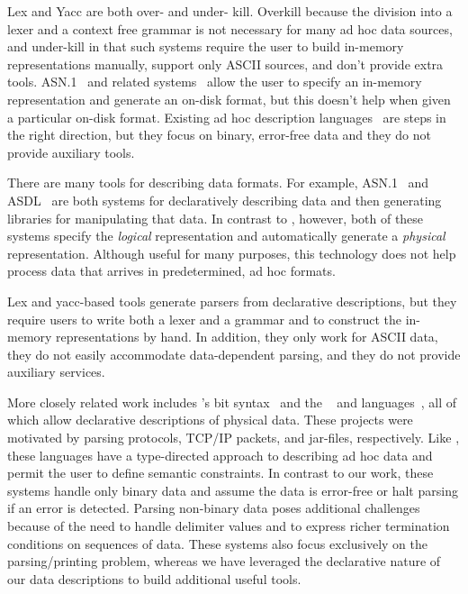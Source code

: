 \documentclass[11pt]{article}
\begin{document}
Lex and Yacc are
both over- and under- kill.  Overkill because the division into a
lexer and a context free grammar is not necessary for many ad hoc data
sources, and under-kill in that such systems require the user to build
in-memory representations manually, support only ASCII sources, and
don't provide extra tools.  ASN.1~\cite{asn} and related
systems~\cite{asdl} allow the user to specify an in-memory
representation and generate an on-disk format, but this doesn't help
when given a particular on-disk format.  Existing ad hoc description
languages~\cite{gpce02,sigcomm00,erlang} are steps in the right
direction, but they focus on binary, error-free data and they do not
provide auxiliary tools.


There are many tools for describing data formats. For example,
\textsc{ASN.1}~\cite{asn} and \textsc{ASDL}~\cite{asdl} are both
systems for declaratively describing data and then generating
libraries for manipulating that data.  In contrast to \pads{},
however, both of these systems specify the {\em logical\/} representation
and automatically generate a {\em physical\/} representation.
Although useful for many purposes, this technology does not help
process data that arrives in predetermined, ad hoc formats.

Lex and yacc-based tools generate parsers from declarative
descriptions, but they require users to write both a lexer and a
grammar and to construct the in-memory representations by hand.  In
addition, they only work for ASCII data, they do not easily
accommodate data-dependent parsing, and they do not provide auxiliary
services.

More closely related work includes \erlang{}'s bit syntax~\cite{erlang} and
the \packettypes{}~\cite{sigcomm00} and
\datascript{} languages~\cite{gpce02}, 
all of which allow declarative descriptions of physical data.  These projects were motivated by parsing protocols,
\textsc{TCP/IP} packets, and \java{} jar-files, respectively.  Like
\pads{}, these languages have a type-directed approach to
describing ad hoc data and permit the user to define semantic constraints.
In contrast to our
work, these systems handle only binary data and assume the data is
error-free or halt parsing if an error is detected. 
Parsing non-binary data poses additional challenges because of the need
to handle delimiter values and to express richer termination conditions
on sequences of data. These systems also
focus exclusively on the parsing/printing problem, whereas we have 
leveraged the declarative nature of
our data descriptions to build additional useful tools.
\end{document}
